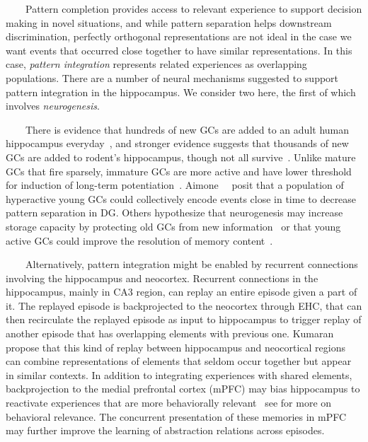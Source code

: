 \begin{center}
\begin{tcolorbox}[breakable,sharp corners=all,coltitle=black,colbacktitle=white,
    width=\textwidth,boxsep=5pt,left=5pt,right=5pt,
    title={\textbf{Box A: Pattern Separation, Completion and Integration}}]
~~~~Pattern completion provides access to relevant experience to support decision making in novel situations, and while pattern separation helps downstream discrimination, perfectly orthogonal representations are not ideal in the case we want events that occurred close together to have similar representations. In this case, {\it{pattern integration}} represents related experiences as overlapping populations. There are a number of neural mechanisms suggested to support pattern integration in the hippocampus. We consider two here, the first of which involves {\it{neurogenesis}}. 

~~~~There is evidence that hundreds of new GCs are added to an adult human hippocampus everyday~\cite{SpaldingetalCELL-13}, and stronger evidence suggests that thousands of new GCs are added to rodent’s hippocampus, though not all survive~\cite{KitabatakeetalNCNM-07}. Unlike mature GCs that fire sparsely, immature GCs are more active and have lower threshold for induction of long-term potentiation~\cite{AimoneetalNEURON-09,GeetalNATURE-06,Schmidt-HieberetalNATURE-04}. Aimone~\etal{}~\cite{AimoneetalNEURON-09} posit that a population of hyperactive young GCs could collectively encode events close in time to decrease pattern separation in DG. Others hypothesize that neurogenesis may increase storage capacity by protecting old GCs from new information~\cite{BeckerHIPPOCAMPUS-05,WiskottetalHIPPOCAMPUS-06} or that young active GCs could improve the resolution of memory content~\cite{AimoneetalNEURON-11}. 

~~~~Alternatively, pattern integration might be enabled by recurrent connections involving the hippocampus and neocortex. Recurrent connections in the hippocampus, mainly in CA3 region, can replay an entire episode given a part of it. The replayed episode is backprojected to the neocortex through EHC, that can then recirculate the replayed episode as input to hippocampus to trigger replay of another episode that has overlapping elements with previous one. Kumaran~\etal{}~\cite{KumaranetalTiCS-16} propose that this kind of replay between hippocampus and neocortical regions can combine representations of elements that seldom occur together but appear in similar contexts. In addition to integrating experiences with shared elements, backprojection to the medial prefrontal cortex (mPFC) may bias hippocampus to reactivate experiences that are more behaviorally relevant~\cite{SchlichtingandPrestonCOiBS} {\emdash{}} see {} for more on behavioral relevance. The concurrent presentation of these memories in mPFC may further improve the learning of abstraction relations across episodes.

  \end{tcolorbox}
\end{center}
